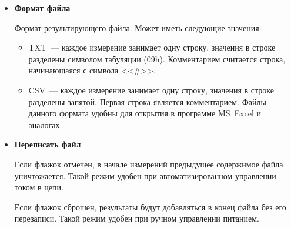 \documentclass[12pt, a4paper, twocolumn]{report}
\newcommand{\PARAM}[1]{\item {\bf #1} }
\begin{document}
\begin{itemize}
\PARAM{Формат файла}

Формат результирующего файла. Может иметь следующие значения:

\begin{itemize}
\item TXT~--- каждое измерение занимает одну строку, значения в строке разделены символом табуляции (09h). Комментарием считается строка, начинающаяся с символа <<\#>>.
\item CSV~--- каждое измерение занимает одну строку, значения в строке разделены запятой. Первая строка является комментарием. Файлы данного формата удобны для открытия в программе MS~Excel и аналогах.
\end{itemize}

\PARAM{Переписать файл}

Если флажок отмечен, в начале измерений предыдущее содержимое файла уничтожается. Такой режим удобен при автоматизированном управлении током в цепи.

Если флажок сброшен, результаты будут добавляться в конец файла без его перезаписи. Такой режим удобен при ручном управлении питанием.

\end{itemize}
\end{document}
